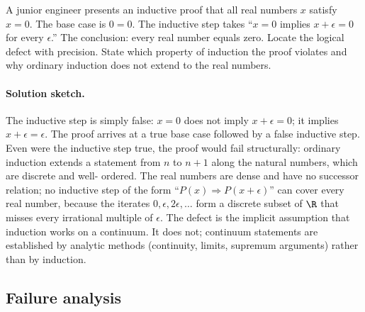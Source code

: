 \begin{exercise}
A junior engineer presents an inductive proof that all real numbers
$x$ satisfy $x = 0$. The base case is $0 = 0$. The inductive step
takes ``$x = 0$ implies $x + \epsilon = 0$ for every $\epsilon$.''
The conclusion: every real number equals zero. Locate the logical
defect with precision. State which property of induction the proof
violates and why ordinary induction does not extend to the real
numbers.

\paragraph{Solution sketch.}
The inductive step is simply false: $x = 0$ does not imply $x +
\epsilon = 0$; it implies $x + \epsilon = \epsilon$. The proof
arrives at a true base case followed by a false inductive step.
Even were the inductive step true, the proof would fail
structurally: ordinary induction extends a statement from $n$ to
$n + 1$ along the natural numbers, which are discrete and well-
ordered. The real numbers are dense and have no successor relation;
no inductive step of the form ``$P(x) \Rightarrow P(x + \epsilon)$''
can cover every real number, because the iterates $0, \epsilon, 2
\epsilon, \ldots$ form a discrete subset of $\R$ that misses every
irrational multiple of $\epsilon$. The defect is the implicit
assumption that induction works on a continuum. It does not;
continuum statements are established by analytic methods (continuity,
limits, supremum arguments) rather than by induction.
\end{exercise}

\subsection*{Failure analysis}

